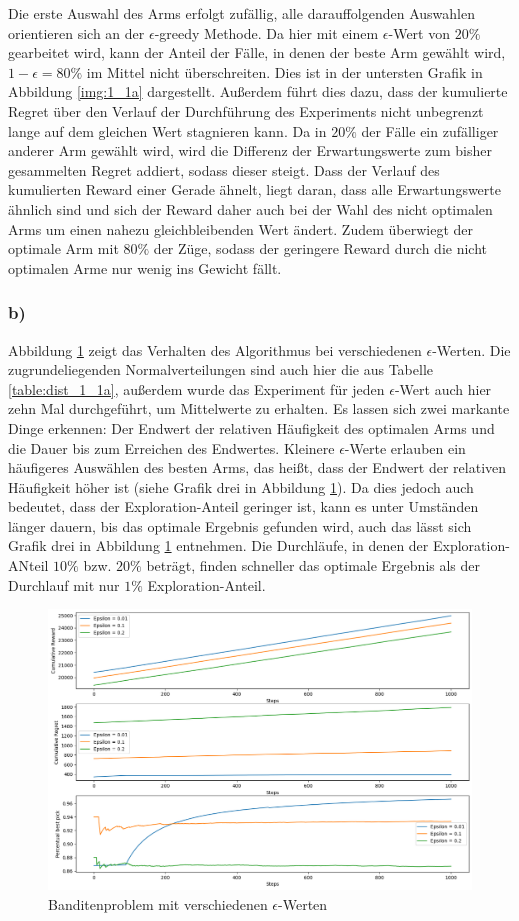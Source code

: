 \documentclass[11pt]{article}
\begin{document}
Die erste Auswahl des Arms erfolgt zufällig, alle darauffolgenden Auswahlen orientieren sich an der $\epsilon$-greedy Methode. Da hier mit einem $\epsilon$-Wert von $20\%$ gearbeitet wird, kann der Anteil der Fälle, in denen der beste Arm gewählt wird, $1-\epsilon = 80\%$ im Mittel nicht überschreiten. Dies ist in der untersten Grafik in Abbildung \ref{img:1_1a} dargestellt. Außerdem führt dies dazu, dass der kumulierte Regret über den Verlauf der Durchführung des Experiments nicht unbegrenzt lange auf dem gleichen Wert stagnieren kann. Da in $20\%$ der Fälle ein zufälliger anderer Arm gewählt wird, wird die Differenz der Erwartungswerte zum bisher gesammelten Regret addiert, sodass dieser steigt.
Dass der Verlauf des kumulierten Reward einer Gerade ähnelt, liegt daran, dass alle Erwartungswerte ähnlich sind und sich der Reward daher auch bei der Wahl des nicht optimalen Arms um einen nahezu gleichbleibenden Wert ändert. Zudem überwiegt der optimale Arm mit $80\%$ der Züge, sodass der geringere Reward durch die nicht optimalen Arme nur wenig ins Gewicht fällt. 
\subsubsection*{b)}
Abbildung \ref{img:1_1b} zeigt das Verhalten des Algorithmus bei verschiedenen $\epsilon$-Werten. Die zugrundeliegenden Normalverteilungen sind auch hier die aus Tabelle \ref{table:dist_1_1a}, außerdem wurde das Experiment für jeden $\epsilon$-Wert auch hier zehn Mal durchgeführt, um Mittelwerte zu erhalten. Es lassen sich zwei markante Dinge erkennen: Der Endwert der relativen Häufigkeit des optimalen Arms und die Dauer bis zum Erreichen des Endwertes. Kleinere $\epsilon$-Werte erlauben ein häufigeres Auswählen des besten Arms, das heißt, dass der Endwert der relativen Häufigkeit höher ist (siehe Grafik drei in Abbildung \ref{img:1_1b}). Da dies jedoch auch bedeutet, dass der Exploration-Anteil geringer ist, kann es unter Umständen länger dauern, bis das optimale Ergebnis gefunden wird, auch das lässt sich Grafik drei in Abbildung \ref{img:1_1b} entnehmen. Die Durchläufe, in denen der Exploration-ANteil $10\%$ bzw. $20\%$ beträgt, finden schneller das optimale Ergebnis als der Durchlauf mit nur $1\%$ Exploration-Anteil. 
\begin{figure}[h]
    \centering
    \includegraphics[width=\textwidth]{img/1_1b.png}
    \caption{Banditenproblem mit verschiedenen $\epsilon$-Werten}
    \label{img:1_1b}
\end{figure}
\end{document}
